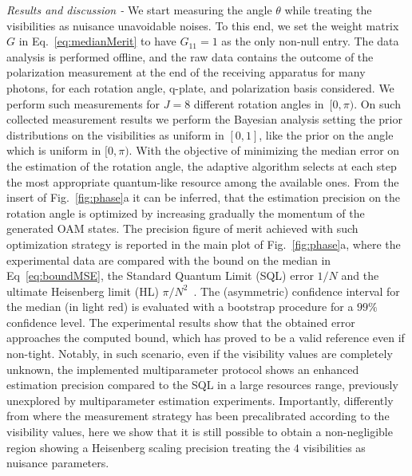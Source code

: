 \documentclass[aps,pra,twocolumn,notitlepage,superscriptaddress]{revtex4-1}
\begin{document}
\emph{Results and discussion -}
%
We start measuring the angle $\theta$ while treating the visibilities as nuisance unavoidable noises. To this end, we set the weight matrix $G$ in Eq.~\eqref{eq:medianMerit} to have $G_{11} = 1$ as the only non-null entry. The data analysis is performed offline, and the raw data contains the outcome of the polarization measurement at the end of the receiving apparatus for many photons, for each rotation angle, q-plate, and polarization basis considered. We perform such measurements for $J=8$ different rotation angles in~$[0, \pi)$. On such collected measurement results we perform the Bayesian analysis setting the prior distributions on the visibilities as uniform in $[0, 1]$, like the prior on the angle which is uniform in $[0, \pi)$. With the objective of minimizing the median error on the estimation of the rotation angle, the adaptive algorithm selects at each step the most appropriate quantum-like resource among the available ones. From the insert of Fig.~\ref{fig:phase}a it can be inferred, that the estimation precision on the rotation angle is optimized by increasing gradually the momentum of the generated OAM states. The precision figure of merit achieved with such optimization strategy is reported in the main plot of Fig.~\ref{fig:phase}a, where the experimental data are compared with the bound on the median in Eq~\eqref{eq:boundMSE}, the Standard Quantum Limit (SQL) error $1/N$ and the ultimate Heisenberg limit (HL) $\pi/N^2$~\cite{PhysRevLett.124.030501}. The (asymmetric) confidence interval for the median (in light red) is evaluated with a bootstrap procedure for a $99\%$ confidence level. The experimental results show that the obtained error approaches the computed bound, which has proved to be a valid reference even if non-tight. Notably, in such scenario, even if the visibility values are completely unknown, the implemented multiparameter protocol shows an enhanced estimation precision compared to the SQL in a large resources range, previously unexplored by multiparameter estimation experiments. Importantly, differently from \cite{cimini2021non} where the measurement strategy has been precalibrated according to the visibility values, here we show that it is still possible to obtain a non-negligible region showing a Heisenberg scaling precision treating the $4$ visibilities as nuisance parameters. 
%
\end{document}
